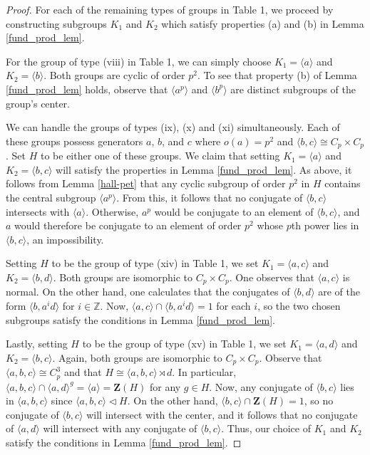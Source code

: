 \documentclass[12pt]{amsart}
\theoremstyle{definition}
\newcommand{\Z}{\mathbb{Z}}
\newcommand{\la}{\langle}
\newcommand{\ra}{\rangle}
\newcommand{\Cent}{\mathbf{Z}}
\begin{document}
\begin{proof}
	For each of the remaining types of groups in Table 1, we proceed by constructing subgroups $K_1$ and $K_2$ which satisfy properties (a) and (b) in Lemma \ref{fund_prod_lem}.
	
	For the group of type (viii) in Table 1, we can simply choose $K_1 = \la a \ra$ and $K_2 = \la b \ra$. Both groups are cyclic of order $p^2$. To see that property (b) of Lemma \ref{fund_prod_lem} holds, observe that $\la a^p \ra$ and $\la b^p \ra$ are distinct subgroups of the group's center. 
	
	We can handle the groups of types (ix), (x) and (xi) simultaneously. Each of these groups possess generators $a$, $b$, and $c$ where $o(a) = p^2$ and $\la b,c \ra \cong C_p \times C_p$. Set $H$ to be either one of these groups. We claim that setting $K_1 = \la a \ra$ and $K_2 = \la b,c \ra$ will satisfy the properties in Lemma \ref{fund_prod_lem}. As above, it follows from Lemma \ref{hall-pet} that any cyclic subgroup of order $p^2$ in $H$ contains the central subgroup $\la a^p \ra$. From this, it follows that no conjugate of $\la b,c \ra$ intersects with $\la a \ra$. Otherwise, $a^p$ would be conjugate to an element of $\la b,c \ra$, and $a$ would therefore be conjugate to an element of order $p^2$ whose $p$th power lies in $\la b,c \ra$, an impossibility.
	
	Setting $H$ to be the group of type (xiv) in Table 1, we set $K_1 = \la a,c \ra$ and $K_2 = \la b,d \ra$. Both groups are isomorphic to $C_p \times C_p$. One observes that $\la a,c \ra$ is normal. On the other hand, one calculates that the conjugates of $\la b,d \ra$ are of the form $\la b, a^id \ra$ for $i \in \Z$. Now, $\la a,c \ra \cap \la b, a^id \ra = 1$ for each $i$, so the two chosen subgroups satisfy the conditions in Lemma \ref{fund_prod_lem}.
	
	Lastly, setting $H$ to be the group of type (xv) in Table 1, we set $K_1 = \la a,d \ra$ and $K_2 = \la b,c \ra$. Again, both groups are isomorphic to $C_p \times C_p$. Observe that $\la a,b,c \ra \cong C_p^3$ and that $H \cong \la a,b,c \ra \rtimes d$. In particular, $\la a,b,c \ra \cap \la a,d \ra^g = \la a \ra = \Cent(H)$ for any $g \in H$.  Now, any conjugate of $\la b,c \ra$ lies in $\la a,b,c \ra$ since $\la a,b,c \ra \triangleleft H$. On the other hand, $\la b,c \ra \cap \Cent(H) = 1$, so no conjugate of $\la b,c \ra$ will intersect with the center, and it follows that no conjugate of $\la a,d \ra$ will intersect with any conjugate of $\la b,c \ra$. Thus, our choice of $K_1$ and $K_2$ satisfy the conditions in Lemma \ref{fund_prod_lem}.
\end{proof}
\end{document}

